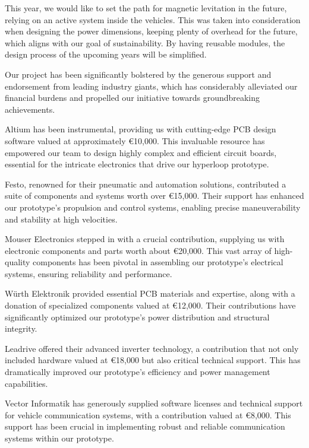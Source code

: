 \par This year, we would like to set the path for magnetic levitation in the future, relying on an active system
inside the vehicles. This was taken into consideration when designing the power dimensions,
keeping plenty of overhead for the future, which aligns with our goal of sustainability.
By having reusable modules, the design process of the upcoming years will be simplified.

\par Our project has been significantly bolstered by the generous support and endorsement from leading industry giants, which has considerably alleviated our financial burdens and propelled our initiative towards groundbreaking achievements.

Altium has been instrumental, providing us with cutting-edge PCB design software valued at approximately \euro 10,000. This invaluable resource has empowered our team to design highly complex and efficient circuit boards, essential for the intricate electronics that drive our hyperloop prototype.

Festo, renowned for their pneumatic and automation solutions, contributed a suite of components and systems worth over \euro 15,000. Their support has enhanced our prototype's propulsion and control systems, enabling precise maneuverability and stability at high velocities.

Mouser Electronics stepped in with a crucial contribution, supplying us with electronic components and parts worth about \euro 20,000. This vast array of high-quality components has been pivotal in assembling our prototype's electrical systems, ensuring reliability and performance.

Würth Elektronik provided essential PCB materials and expertise, along with a donation of specialized components valued at \euro 12,000. Their contributions have significantly optimized our prototype's power distribution and structural integrity.

Leadrive offered their advanced inverter technology, a contribution that not only included hardware valued at \euro 18,000 but also critical technical support. This has dramatically improved our prototype's efficiency and power management capabilities.

Vector Informatik has generously supplied software licenses and technical support for vehicle communication systems, with a contribution valued at \euro 8,000. This support has been crucial in implementing robust and reliable communication systems within our prototype.


